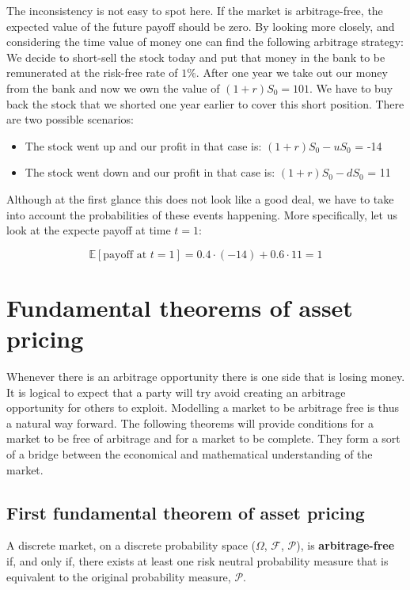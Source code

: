 \documentclass[times, utf8, diplomski]{fer}
\begin{document}
The inconsistency is not easy to spot here. If the market is arbitrage-free, the expected value of the future payoff should be zero. By looking more closely, and considering the time value of money one can find the following arbitrage strategy:
We decide to short-sell the stock today and put that money in the bank to be remunerated at the risk-free rate of $1\%$. After one year we take out our money from the bank and now we own the value of $(1+r)S_0 = 101$. We have to buy back the stock that we shorted one year earlier to cover this short position. There are two possible scenarios:
\hfill \break
\begin{itemize}
	\item The stock went up and our profit in that case is: $(1+r)S_0 - uS_0$ = -14
	\item The stock went down and our profit in that case is: $(1+r)S_0 - dS_0$ = 11
\end{itemize}
\hfill \break
Although at the first glance this does not look like a good deal, we have to take into account the probabilities of these events happening. More specifically, let us look at the expecte payoff at time $t=1$:

$$\mathbb{E}[\text{payoff at } t=1] = 0.4 \cdot (-14) + 0.6 \cdot 11 = 1$$

\newpage
\section{Fundamental theorems of asset pricing}
Whenever there is an arbitrage opportunity there is one side that is losing money. It is logical to expect that a party will try avoid creating an arbitrage opportunity for others to exploit. Modelling a market to be arbitrage free is thus a natural way forward. The following theorems will provide conditions for a market to be free of arbitrage and for a market to be complete. They form a sort of a bridge between the economical and mathematical understanding of the market.
\subsection{First fundamental theorem of asset pricing}
\begin{theorem} \label{tm:ftap1}
	A discrete market, on a discrete probability space ($\Omega$, $\mathcal{F}$, $\mathcal{P}$), is \textbf{arbitrage-free} if, and only if, there exists at least one risk neutral probability measure that is equivalent to the original probability measure, $\mathcal{P}$.
\end{theorem}
\end{document}
